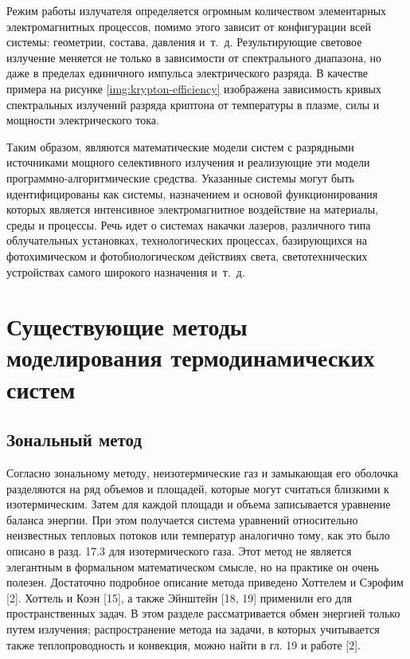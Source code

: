 Режим работы излучателя определяется огромным количеством элементарных электромагнитных процессов, помимо этого зависит от конфигурации всей системы: геометрии, состава, давления и~т.~д.
Результирующие световое излучение меняется не только в зависимости от спектрального диапазона, но даже в пределах единичного импульса электрического разряда.
В качестве примера на рисунке \ref{img:krypton-efficiency} изображена зависимость кривых спектральных излучений разряда криптона от температуры в плазме, силы и мощности электрического тока.

Таким образом,  являются математические модели систем с разрядными источниками мощного селективного излучения и реализующие эти модели программно-алгоритмические средства.
Указанные системы могут быть идентифицированы как системы, назначением и основой функционирования которых является интенсивное электромагнитное воздействие на материалы, среды и процессы.
Речь идет о системах накачки лазеров, различного типа облучательных установках, технологических процессах, базирующихся на фотохимическом и фотобиологическом действиях света, светотехнических устройствах самого широкого назначения и~т.~д.

\section{Существующие методы моделирования термодинамических систем}

\subsection{Зональный метод}

Согласно зональному методу, неизотермические газ и
замыкающая его оболочка разделяются на ряд объемов и площадей, которые
могут считаться близкими к изотермическим. Затем для каждой
площади и объема записывается уравнение баланса энергии. При
этом получается система уравнений относительно неизвестных
тепловых потоков или температур аналогично тому, как это было
описано в разд. 17.3 для изотермического газа. Этот метод
не является элегантным в формальном математическом смысле,
но на практике он очень полезен. Достаточно подробное описание
метода приведено Хоттелем и Сэрофим [2]. Хоттель и Коэн [15],
а также Эйнштейн [18, 19] применили его для пространственных задач.
В этом разделе рассматривается обмен энергией только
путем излучения; распространение метода на задачи, в которых
учитывается также теплопроводность и конвекция, можно найти
в гл. 19 и работе [2].

